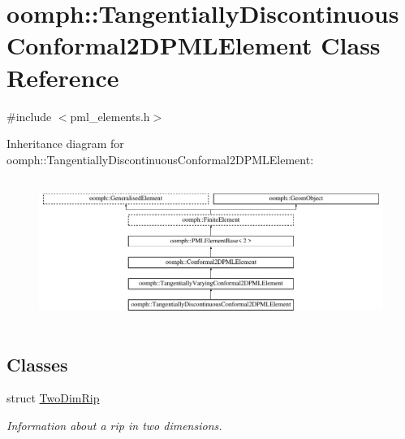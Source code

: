 \hypertarget{classoomph_1_1TangentiallyDiscontinuousConformal2DPMLElement}{}\section{oomph\+:\+:Tangentially\+Discontinuous\+Conformal2\+D\+P\+M\+L\+Element Class Reference}
\label{classoomph_1_1TangentiallyDiscontinuousConformal2DPMLElement}


{\ttfamily \#include $<$pml\+\_\+elements.\+h$>$}

Inheritance diagram for oomph\+:\+:Tangentially\+Discontinuous\+Conformal2\+D\+P\+M\+L\+Element\+:\begin{figure}[H]
\begin{center}
\leavevmode
\includegraphics[height=4.745763cm]{classoomph_1_1TangentiallyDiscontinuousConformal2DPMLElement}
\end{center}
\end{figure}
\subsection*{Classes}
\begin{DoxyCompactItemize}
\item 
struct \hyperlink{structoomph_1_1TangentiallyDiscontinuousConformal2DPMLElement_1_1TwoDimRip}{Two\+Dim\+Rip}
\begin{DoxyCompactList}\small\item\em Information about a rip in two dimensions. \end{DoxyCompactList}\end{DoxyCompactItemize}
